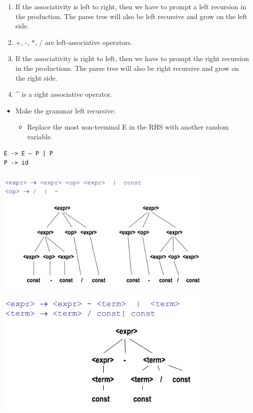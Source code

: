 \documentclass[11pt]{article}
\begin{document}
\begin{enumerate}
\item If the associativity is left to right, then we have to prompt a left
recursion in the production. The parse tree will also be left recursive
and grow on the left side.
\item +, -, *, / are left-associative operators.
\item If the associativity is right to left, then we have to prompt the right
recursion in the productions. The parse tree will also be right recursive
and grow on the right side.
\item \^{} is a right associative operator.
\end{enumerate}


\begin{itemize}
\item Make the grammar left recursive:

\begin{itemize}
\item Replace the most non-terminal E in the RHS with another random variable.
\end{itemize}
\end{itemize}

\begin{verbatim}
E -> E – P | P
P -> id
\end{verbatim}

\begin{center}
\includegraphics[width=0.8\textwidth]{./figures/f1.png}
\label{fig2}
\end{center}

\begin{center}
\includegraphics[width=0.8\textwidth]{./figures/f2.png}
\label{fig3}
\end{center}
\end{document}
